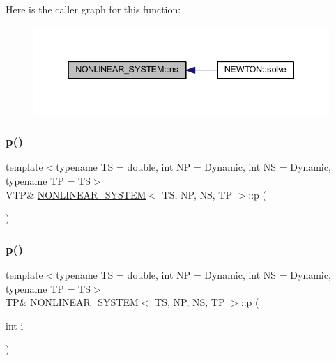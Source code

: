 Here is the caller graph for this function\+:\nopagebreak
\begin{figure}[H]
\begin{center}
\leavevmode
\includegraphics[width=337pt]{class_n_o_n_l_i_n_e_a_r___s_y_s_t_e_m_abf4102c649f8316e44033a76f9d6183f_icgraph}
\end{center}
\end{figure}
\mbox{\label{class_n_o_n_l_i_n_e_a_r___s_y_s_t_e_m_a1536a98a6cb3fec681bdd3312ae43714}} 
\subsubsection{\texorpdfstring{p()}{p()}\hspace{0.1cm}{\footnotesize\ttfamily [1/2]}}
{\footnotesize\ttfamily template$<$typename TS = double, int NP = Dynamic, int NS = Dynamic, typename TP = TS$>$ \\
V\+TP\& \mbox{\hyperlink{class_n_o_n_l_i_n_e_a_r___s_y_s_t_e_m}{N\+O\+N\+L\+I\+N\+E\+A\+R\+\_\+\+S\+Y\+S\+T\+EM}}$<$ TS, NP, NS, TP $>$\+::p (\begin{DoxyParamCaption}{ }\end{DoxyParamCaption})\hspace{0.3cm}{\ttfamily [inline]}}

\mbox{\label{class_n_o_n_l_i_n_e_a_r___s_y_s_t_e_m_a75739c8370b0aa04f8f03e88ac19d09b}} 
\subsubsection{\texorpdfstring{p()}{p()}\hspace{0.1cm}{\footnotesize\ttfamily [2/2]}}
{\footnotesize\ttfamily template$<$typename TS = double, int NP = Dynamic, int NS = Dynamic, typename TP = TS$>$ \\
TP\& \mbox{\hyperlink{class_n_o_n_l_i_n_e_a_r___s_y_s_t_e_m}{N\+O\+N\+L\+I\+N\+E\+A\+R\+\_\+\+S\+Y\+S\+T\+EM}}$<$ TS, NP, NS, TP $>$\+::p (\begin{DoxyParamCaption}\item[{int}]{i }\end{DoxyParamCaption})\hspace{0.3cm}{\ttfamily [inline]}}

